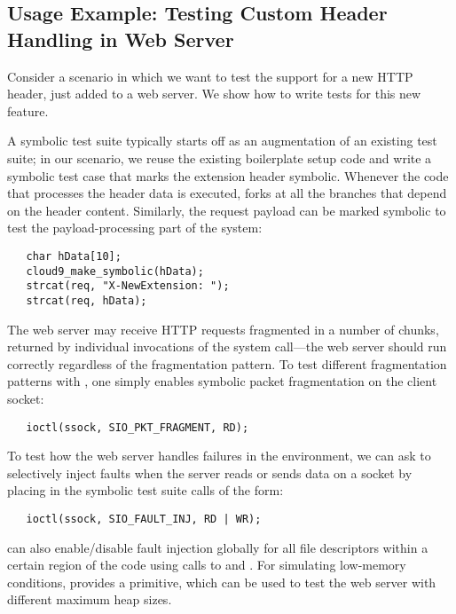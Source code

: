 \subsection{Usage Example: Testing Custom Header Handling in Web Server}

Consider a scenario in which we want to test the support for a new  HTTP header, just added to a web server.
%
We show how to write tests for this new feature.

A symbolic test suite typically starts off as an augmentation of an existing test suite;
%
in our scenario, we reuse the existing boilerplate setup code and write a symbolic test case that marks the extension header symbolic. Whenever the code that processes the header data is executed, \cnine forks at all the branches that depend on the header content. Similarly, the request payload can be marked symbolic to test the payload-processing part of the system:

\begin{verbatim}
   char hData[10];
   cloud9_make_symbolic(hData);
   strcat(req, "X-NewExtension: ");
   strcat(req, hData);
\end{verbatim}

The web server may receive HTTP requests fragmented in a number of chunks, returned by individual invocations of the  system call---the web server should run correctly regardless of the fragmentation pattern.
%
To test different fragmentation patterns with \cnine, one simply enables symbolic packet fragmentation on the client socket:
\begin{verbatim}
   ioctl(ssock, SIO_PKT_FRAGMENT, RD);
\end{verbatim}

To test how the web server handles failures in the environment, we can ask \cnine to selectively inject faults when the server reads or sends data on a socket by placing in the symbolic test suite calls of the form:
\begin{verbatim}
   ioctl(ssock, SIO_FAULT_INJ, RD | WR);
\end{verbatim}
\cnine can also enable/disable fault injection globally for all file descriptors within a certain region of the code using calls to  and . For simulating low-memory conditions, \cnine provides a  primitive, which can be used to test the web server with different maximum heap sizes.

